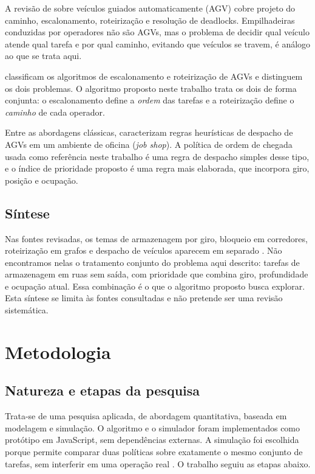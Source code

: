 \documentclass[
	article,
	11pt,
	oneside,
	a4paper,
	english,
	brazil,
	sumario=tradicional
	]{abntex2}
\begin{document}
A revisão de  sobre veículos guiados automaticamente
(AGV) cobre projeto do caminho, escalonamento, roteirização e resolução de
deadlocks. Empilhadeiras conduzidas por operadores não são AGVs, mas o problema
de decidir qual veículo atende qual tarefa e por qual caminho, evitando que
veículos se travem, é análogo ao que se trata aqui.

 classificam os algoritmos de escalonamento e roteirização
de AGVs e distinguem os dois problemas. O algoritmo proposto neste trabalho
trata os dois de forma conjunta: o escalonamento define a \emph{ordem} das
tarefas e a roteirização define o \emph{caminho} de cada operador.

Entre as abordagens clássicas,  caracterizam regras
heurísticas de despacho de AGVs em um ambiente de oficina (\emph{job shop}).
A política de ordem de chegada usada como referência neste trabalho é uma regra
de despacho simples desse tipo, e o índice de prioridade proposto é uma regra
mais elaborada, que incorpora giro, posição e ocupação.

\subsection{Síntese}

Nas fontes revisadas, os temas de armazenagem por giro, bloqueio em corredores,
roteirização em grafos e despacho de veículos aparecem em separado
\cite{bonassa2011,gu2007,hausman1976,leanh2006,parikh2009,silva2017}. Não encontramos nelas o
tratamento conjunto do problema aqui descrito: tarefas de armazenagem em ruas
sem saída, com prioridade que combina giro, profundidade e ocupação atual. Essa
combinação é o que o algoritmo proposto busca explorar. Esta síntese se limita
às fontes consultadas e não pretende ser uma revisão sistemática.

\section{Metodologia}
\label{sec:metodologia}

\subsection{Natureza e etapas da pesquisa}

Trata-se de uma pesquisa aplicada, de abordagem quantitativa, baseada em
modelagem e simulação. O algoritmo e o simulador foram implementados como
protótipo em JavaScript, sem dependências externas. A simulação foi escolhida
porque permite comparar duas políticas sobre exatamente o mesmo conjunto de
tarefas, sem interferir em uma operação real \cite{law2000,silva2017}. O trabalho seguiu
as etapas abaixo.
\end{document}
